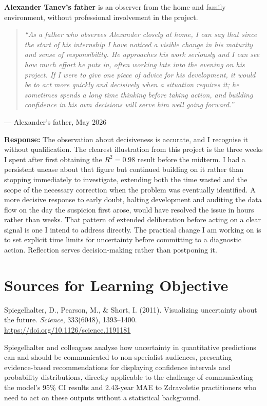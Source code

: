 \documentclass[11pt,a4paper]{report}
\begin{document}
\bigskip

\textbf{Alexander Tanev's father} is an observer from the home and family environment, without
professional involvement in the project.

\begin{quotation}
\itshape
``As a father who observes Alexander closely at home, I can say that since the start of his
internship I have noticed a visible change in his maturity and sense of responsibility. He
approaches his work seriously and I can see how much effort he puts in, often working late into the
evening on his project. If I were to give one piece of advice for his development, it would be to
act more quickly and decisively when a situation requires it; he sometimes spends a long time
thinking before taking action, and building confidence in his own decisions will serve him well
going forward.''
\end{quotation}
\noindent --- Alexander's father, May 2026

\textbf{Response:} The observation about decisiveness is accurate, and I recognise it without
qualification. The clearest illustration from this project is the three weeks I spent after first
obtaining the $R^2 = 0.98$ result before the midterm. I had a persistent unease about that figure
but continued building on it rather than stopping immediately to investigate, extending both the
time wasted and the scope of the necessary correction when the problem was eventually identified.
A more decisive response to early doubt, halting development and auditing the data flow on the
day the suspicion first arose, would have resolved the issue in hours rather than weeks. That
pattern of extended deliberation before acting on a clear signal is one I intend to address
directly. The practical change I am working on is to set explicit time limits for uncertainty
before committing to a diagnostic action. Reflection serves decision-making rather than
postponing it.

\section{Sources for Learning Objective}

Spiegelhalter, D., Pearson, M., \& Short, I. (2011). Visualizing uncertainty about the future.
\textit{Science}, 333(6048), 1393--1400. \url{https://doi.org/10.1126/science.1191181}

Spiegelhalter and colleagues analyse how uncertainty in quantitative predictions can and should be
communicated to non-specialist audiences, presenting evidence-based recommendations for displaying
confidence intervals and probability distributions, directly applicable to the challenge of
communicating the model's 95\% CI results and 2.43-year MAE to Zdravoletie practitioners who need
to act on these outputs without a statistical background.
\end{document}
